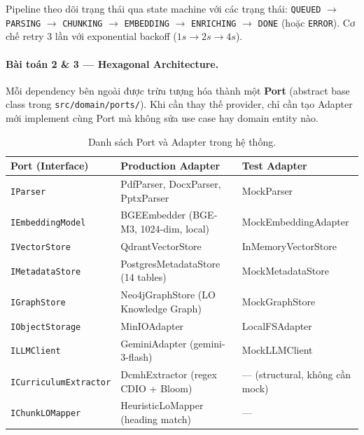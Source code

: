 Pipeline theo dõi trạng thái qua state machine với các trạng thái:
\texttt{QUEUED} $\to$ \texttt{PARSING} $\to$ \texttt{CHUNKING}
$\to$ \texttt{EMBEDDING} $\to$ \texttt{ENRICHING} $\to$
\texttt{DONE} (hoặc \texttt{ERROR}). Cơ chế retry 3 lần với
exponential backoff ($1s \to 2s \to 4s$).

\paragraph{Bài toán 2 \& 3 --- Hexagonal Architecture.}

Mỗi dependency bên ngoài được trừu tượng hóa thành một \textbf{Port}
(abstract base class trong \texttt{src/domain/ports/}). Khi cần
thay thế provider, chỉ cần tạo Adapter mới implement cùng Port mà
không sửa use case hay domain entity nào.

\begin{table}[H]
    \centering
    \caption{Danh sách Port và Adapter trong hệ thống.}
    \label{tab:ports-adapters}
    \begin{tabular}{p{3.5cm}p{5cm}p{6cm}}
        \toprule
        \textbf{Port (Interface)} & \textbf{Production Adapter} & \textbf{Test Adapter} \\
        \midrule
        \texttt{IParser}
            & PdfParser, DocxParser, PptxParser
            & MockParser \\
        \texttt{IEmbeddingModel}
            & BGEEmbedder (BGE-M3, 1024-dim, local)
            & MockEmbeddingAdapter \\
        \texttt{IVectorStore}
            & QdrantVectorStore
            & InMemoryVectorStore \\
        \texttt{IMetadataStore}
            & PostgresMetadataStore (14 tables)
            & MockMetadataStore \\
        \texttt{IGraphStore}
            & Neo4jGraphStore (LO Knowledge Graph)
            & MockGraphStore \\
        \texttt{IObjectStorage}
            & MinIOAdapter
            & LocalFSAdapter \\
        \texttt{ILLMClient}
            & GeminiAdapter (gemini-3-flash)
            & MockLLMClient \\
        \texttt{ICurriculumExtractor}
            & DcmhExtractor (regex CDIO + Bloom)
            & --- (structural, không cần mock) \\
        \texttt{IChunkLOMapper}
            & HeuristicLoMapper (heading match)
            & --- \\
        \bottomrule
    \end{tabular}
\end{table}

